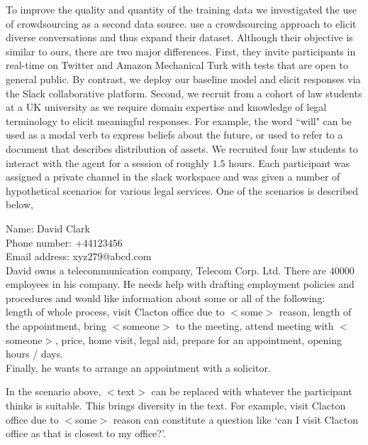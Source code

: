 \documentclass[runningheads]{llncs}
\begin{document}
To improve the quality and quantity of the training data we investigated the use of crowdsourcing as a second data source. \cite{yu2016chatbot,bessho2012dialog} use a crowdsourcing approach to elicit diverse conversations and thus expand their dataset. Although their objective is similar to ours, there are two major differences. First, they invite participants in real-time on Twitter and Amazon Mechanical Turk with tests that are open to general public. By contrast, we deploy our baseline model and elicit responses via the Slack collaborative platform. Second, we recruit from a cohort of law students at a UK university as we require domain expertise and knowledge of legal terminology to elicit meaningful responses.
For example, the word ``will" can be used as a modal verb to express beliefs about the future, or used to refer to a document that describes distribution of assets. 
We recruited four law students to interact with the agent for a session of roughly $1.5$ hours. Each participant was assigned a private channel in the slack workspace and was given a number of hypothetical scenarios for various legal services. One of the scenarios is described below, \\

\begin{adjustwidth*}{0.15\linewidth}{}
Name: David Clark\\
Phone number: $+44123456$ \\
Email address: xyz279@abcd.com \\
David owns a telecommunication company, Telecom Corp. Ltd. There are $40000$ employees in his company. He needs help with drafting employment policies and procedures and would like information about some or all of the following: \\
length of whole process, visit Clacton office due to $<$some$>$ reason, length of the appointment, bring $<$someone$>$ to the meeting, attend meeting with $<$someone$>$, price, home visit, legal aid, prepare for an appointment, opening hours / days.\\
Finally, he wants to arrange an appointment with a solicitor.\\
\end{adjustwidth*}

In the scenario above, $<$text$>$ can be replaced with whatever the participant thinks is suitable. This brings diversity in the text. For example, visit Clacton office due to $<$some$>$ reason can constitute a question like ‘can I visit Clacton office as that is closest to my office?’. \\
\end{document}

